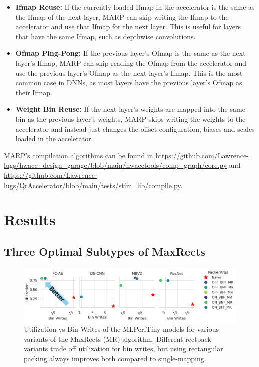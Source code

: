 \begin{itemize}
    \item \textbf{Ifmap Reuse:} If the currently loaded Ifmap in the accelerator is the same as the Ifmap of the next layer, MARP can skip writing the Ifmap to the accelerator and use that Ifmap for the next layer. This is useful for layers that have the same Ifmap, such as depthwise convolutions.
    \item \textbf{Ofmap Ping-Pong:} If the previous layer's Ofmap is the same as the next layer's Ifmap, MARP can skip reading the Ofmap from the accelerator and use the previous layer's Ofmap as the next layer's Ifmap. This is the most common case in DNNs, as most layers have the previous layer's Ofmap as their Ifmap.
    \item \textbf{Weight Bin Reuse:} If the next layer's weights are mapped into the same bin as the previous layer's weights, MARP skips writing the weights to the accelerator and instead just changes the offset configuration, biases and scales loaded in the accelerator.
    
\end{itemize}

MARP's compilation algorithms can be found in \url{https://github.com/Lawrence-lugs/hwacc_design_garage/blob/main/hwacctools/comp_graph/core.py} and \url{https://github.com/Lawrence-lugs/QrAccelerator/blob/main/tests/stim_lib/compile.py}.

\section{Results}

\subsection{Three Optimal Subtypes of MaxRects}

\begin{figure}[htbp]
    \centering
    \includegraphics[width=\textwidth]{images/marp/mlperftiny_packers.png}
    \caption{Utilization vs Bin Writes of the MLPerfTiny models for various variants of the MaxRects (MR) algorithm. Different rectpack variants trade off utilization for bin writes, but using rectangular packing always improves both compared to single-mapping.}
    \label{fig:mlperftiny_packers}
\end{figure}


